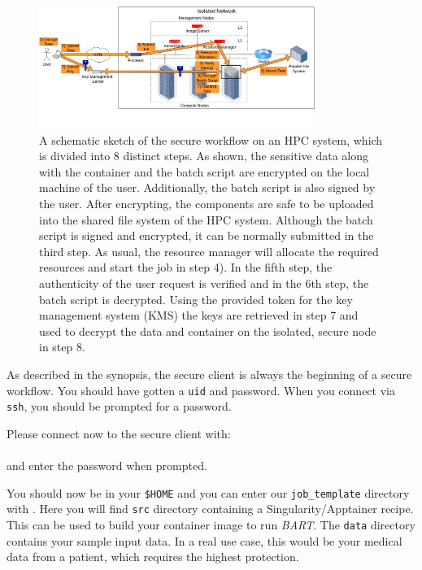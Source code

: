 \documentclass[paper=a4]{scrartcl}
\begin{document}
\begin{figure}[!ht]
    \centerline{\includegraphics[width=0.8\textwidth]{secure_submission_neu.png}}
    \caption{A schematic sketch of the secure workflow on an HPC system, which is divided into 8 distinct steps. As shown, the sensitive data along with the container and the batch script are encrypted on the local machine of the user. Additionally, the batch script is also signed by the user. After encrypting, the components are safe to be uploaded into the shared file system of the HPC system. Although the batch script is signed and encrypted, it can be normally submitted in the third step. As usual, the resource manager will allocate the required resources and start the job in step 4). In the fifth step, the authenticity of the user request is verified and in the 6th step, the batch script is decrypted. Using the provided token for the key management system (KMS) the keys are retrieved in step 7 and used to decrypt the data and container on the isolated, secure node in step 8. }
    \label{fig:secure_sbatch}
\end{figure}

As described in the synopsis, the secure client is always the beginning of a secure workflow. 
You should have gotten a \texttt{uid} and password. 
When you connect via \texttt{ssh}, you should be prompted for a password.

Please connect now to the secure client with:\\
\\and enter the password when prompted. 

You should now be in your \texttt{\$HOME} and you can enter our \texttt{job\_template} directory with . 
Here you will find \texttt{src} directory containing a Singularity/Apptainer recipe. 
This can be used to build your container image to run \textit{BART}. 
The \texttt{data} directory contains your sample input data. 
In a real use case, this would be your medical data from a patient, which requires the highest protection. 
\end{document}
